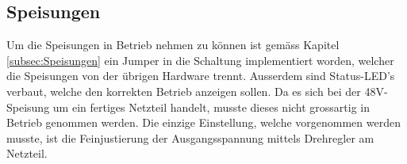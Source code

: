 \subsection{Speisungen}
\label{subsec:Inbetriebnahme_Speisungen}

Um die Speisungen in Betrieb nehmen zu können ist gemäss Kapitel \ref{subsec:Speisungen} ein Jumper in die Schaltung implementiert worden, welcher die Speisungen von der übrigen Hardware trennt. Ausserdem sind Status-LED's verbaut, welche den korrekten Betrieb anzeigen sollen. Da es sich bei der 48V-Speisung um ein fertiges Netzteil handelt, musste dieses nicht grossartig in Betrieb genommen werden. Die einzige Einstellung, welche vorgenommen werden musste, ist die Feinjustierung der Ausgangsspannung mittels Drehregler am Netzteil.
